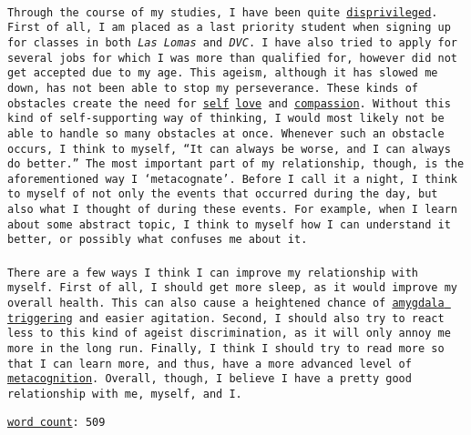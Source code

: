\documentclass[11pt]{Essay} %
\begin{document}



\paragraph{} \texttt{Through the course of my studies, I have been quite \underline{disprivileged}. First of all, I am placed as a last priority student when signing up for classes in both \textit{Las Lomas} and \textit{DVC}. I have also tried to apply for several jobs for which I was more than qualified for, however did not get accepted due to my age. This ageism, although it has slowed me down, has not been able to stop my perseverance. These kinds of obstacles create the need for \underline{self} \underline{love} and \underline{compassion}. Without this kind of self-supporting way of thinking, I would most likely not be able to handle so many obstacles at once. Whenever such an obstacle occurs, I think to myself, ``It can always be worse, and I can always do better.'' The most important part of my relationship, though, is the aforementioned way I `\underline{metacognate}'. Before I call it a night, I think to myself of not only the events that occurred during the day, but also what I thought of during these events. For example, when I learn about some abstract topic, I think to myself how I can understand it better, or possibly what confuses me about it.}



\paragraph{} \texttt{There are a few ways I think I can improve my relationship with myself. First of all, I should get more sleep, as it would improve my overall health. This can also cause a heightened chance of \underline{amygdala triggering} and easier agitation. Second, I should also try to react less to this kind of ageist discrimination, as it will only annoy me more in the long run. Finally, I think I should try to read more so that I can learn more, and thus, have a more advanced level of \underline{metacognition}. Overall, though, I believe I have a pretty good relationship with me, myself, and I.}

\vspace{15pt}

\begin{center}
\underline{\texttt{word count}}\texttt{: 509} 
\end{center}

\end{document}
